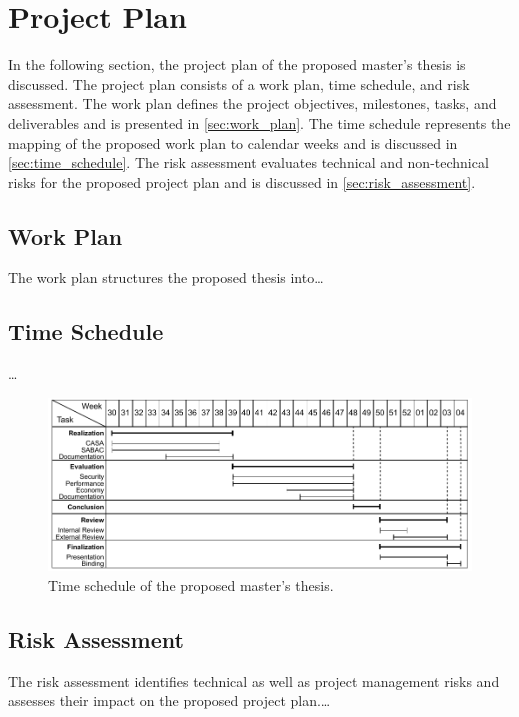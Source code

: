 \chapter{Project Plan}
\label{ch:project_plan}
In the following section, the project plan of the proposed master's thesis is discussed.
The project plan consists of a work plan, time schedule, and risk assessment.
The work plan defines the project objectives, milestones, tasks, and deliverables and is presented in \autoref{sec:work_plan}.
The time schedule represents the mapping of the proposed work plan to calendar weeks and is discussed in \autoref{sec:time_schedule}.
The risk assessment evaluates technical and non-technical risks for the proposed project plan and is discussed in \autoref{sec:risk_assessment}.

\section{Work Plan}
\label{sec:work_plan}
The work plan structures the proposed thesis into\dots 
{}

\section{Time Schedule}
\label{sec:time_schedule}
\dots
\begin{figure}
    \centering
    \includegraphics[width=1.0\linewidth]{figures/timeplan.drawio.pdf}
    \caption{Time schedule of the proposed master's thesis.}
    \label{fig:timeplan}
\end{figure}

\section{Risk Assessment}
\label{sec:risk_assessment}
The risk assessment identifies technical as well as project management risks and assesses their impact on the proposed project plan.\dots
{}
